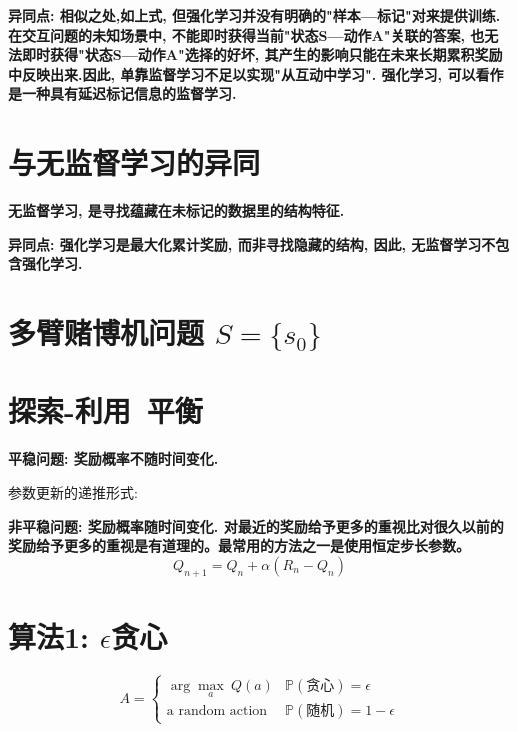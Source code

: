             \bf{异同点}: 相似之处,如上式, 但强化学习并没有明确的"样本---标记"对来提供训练. 在交互问题的未知场景中, 不能即时获得当前"状态S---动作A"关联的答案, 也无法即时获得"状态S---动作A"选择的好坏, 其产生的影响只能在未来长期累积奖励中反映出来.因此, 单靠监督学习不足以实现"从互动中学习". 强化学习, 可以看作是一种具有延迟标记信息的监督学习.
            
            
        
        \section{与无监督学习的异同}
            \bf{无监督学习}, 是寻找蕴藏在未标记的数据里的结构特征.

            \bf{异同点}: 强化学习是最大化累计奖励, 而非寻找隐藏的结构, 因此, 无监督学习不包含强化学习.

        
        
    \section{多臂赌博机问题 $S = \{s_0\}$}
        \section{探索-利用\ 平衡}
        
        \bf{平稳问题}: 奖励概率不随时间变化.
        
        参数更新的递推形式:
        
        \bf{非平稳问题}: 奖励概率随时间变化. 对最近的奖励给予更多的重视比对很久以前的奖励给予更多的重视是有道理的。最常用的方法之一是使用恒定步长参数。
            $$Q_{n+1} = Q_n + \alpha (R_n - Q_n)$$
            
        \section{算法1: $\epsilon$贪心}
            \begin{displaymath} A = \left\{ \begin{array}{ll}
                \arg\max_a\ Q(a) & \mathbb{P}(\text{贪心}) = \epsilon\\
                \text{a random action} & \mathbb{P}(\text{随机}) = 1 - \epsilon
            \end{array} \right. \end{displaymath}
            
